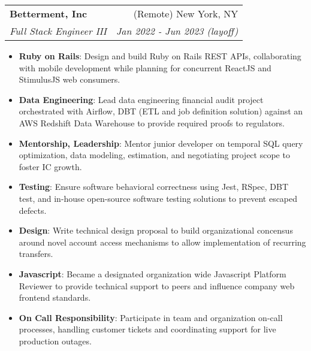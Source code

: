 \documentclass[letterpaper,11pt]{article}
\makeatletter
\newcommand{\resumeItem}[2]{
  \item\small{
    \textbf{#1}{: #2 \vspace{-2pt}}
  }
}
\newcommand{\resumeSubheading}[4]{
  \vspace{-1pt}\item
    \begin{tabular*}{0.97\textwidth}{l@{\extracolsep{\fill}}r}
      \textbf{#1} & #2 \\
      \textit{\small#3} & \textit{\small #4} \\
    \end{tabular*}\vspace{-5pt}
}
\newcommand{\resumeItemListStart}{\begin{itemize}}
\newcommand{\resumeItemListEnd}{\end{itemize}\vspace{-5pt}}
\makeatother
\begin{document}
    \resumeSubheading
      {Betterment, Inc}{(Remote) New York, NY}
      {Full Stack Engineer III}{Jan 2022 - Jun 2023 (layoff)}
      \resumeItemListStart
        \resumeItem{Ruby on Rails}
          {Design and build Ruby on Rails REST APIs, collaborating with mobile development while planning for concurrent ReactJS and StimulusJS web consumers.}
        \resumeItem{Data Engineering}
          {Lead data engineering financial audit project orchestrated with Airflow, DBT (ETL and job definition solution) against an AWS Redshift Data Warehouse to provide required proofs to regulators.}
        \resumeItem{Mentorship, Leadership}
          {Mentor junior developer on temporal SQL query optimization, data modeling, estimation, and negotiating project scope to foster IC growth.}
        \resumeItem{Testing}
          {Ensure software behavioral correctness using Jest, RSpec, DBT test, and in-house open-source software testing solutions to prevent escaped defects.}
        \resumeItem{Design}
          {Write technical design proposal to build organizational concensus around novel account access mechanisms to allow implementation of recurring transfers.}
        \resumeItem{Javascript}
          {Became a designated organization wide Javascript Platform Reviewer to provide technical support to peers and influence company web frontend standards.}
        \resumeItem{On Call Responsibility}
          {Participate in team and organization on-call processes, handling customer tickets and coordinating support for live production outages.}
      \resumeItemListEnd
\end{document}
